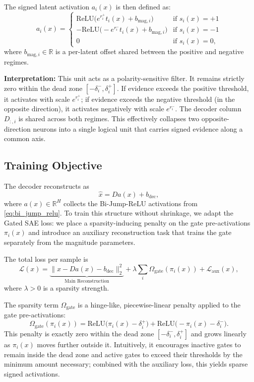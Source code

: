 \documentclass{article}
\begin{document}
The signed latent activation $a_i(x)$ is then defined as:
\begin{equation}
    \label{eq:bi_jump_relu}
    a_i(x) = 
    \begin{cases} 
        \text{ReLU}\big(e^{r_i^+} t_i(x) + b_{\text{mag}, i}\big) & \text{if } s_i(x) = +1 \\
        -\text{ReLU}\big(-e^{r_i^-} t_i(x) + b_{\text{mag}, i}\big) & \text{if } s_i(x) = -1 \\
        0 & \text{if } s_i(x) = 0,
    \end{cases}
\end{equation}
where $b_{\text{mag},i} \in \mathbb{R}$ is a per-latent offset shared between the positive and negative regimes.

\textbf{Interpretation:} This unit acts as a polarity-sensitive filter. It remains strictly zero within the dead zone $[-\delta_i^-, \delta_i^+]$. If evidence exceeds the positive threshold, it activates with scale $e^{r_i^+}$; if evidence exceeds the negative threshold (in the opposite direction), it activates negatively with scale $e^{r_i^-}$. The decoder column $D_{:,i}$ is shared across both regimes. This effectively collapses two opposite-direction neurons into a single logical unit that carries signed evidence along a common axis.

\subsection{Training Objective}

The decoder reconstructs as
\begin{equation}
    \hat{x} = D a(x) + b_{\text{dec}},
\end{equation}
where $a(x) \in \mathbb{R}^H$ collects the Bi-Jump-ReLU activations from \cref{eq:bi_jump_relu}. To train this structure without shrinkage, we adapt the Gated SAE loss: we place a sparsity-inducing penalty on the gate pre-activations $\pi_i(x)$ and introduce an auxiliary reconstruction task that trains the gate separately from the magnitude parameters.

The total loss per sample is
\begin{equation}
    \mathcal{L}(x) = \underbrace{\|x - D a(x) - b_{\text{dec}}\|_2^2}_{\text{Main Reconstruction}} + \lambda \sum_i \Omega_{\text{gate}}(\pi_i(x)) + \mathcal{L}_{\text{aux}}(x),
\end{equation}
where $\lambda > 0$ is a sparsity strength.

The sparsity term $\Omega_{\text{gate}}$ is a hinge-like, piecewise-linear penalty applied to the gate pre-activations:
\begin{equation}
    \Omega_{\text{gate}}(\pi_i(x)) = \text{ReLU}\big(\pi_i(x) - \delta_i^+\big) + \text{ReLU}\big(-\pi_i(x) - \delta_i^-\big).
\end{equation}
This penalty is exactly zero within the dead zone $[-\delta_i^-, \delta_i^+]$ and grows linearly as $\pi_i(x)$ moves further outside it. Intuitively, it encourages inactive gates to remain inside the dead zone and active gates to exceed their thresholds by the minimum amount necessary; combined with the auxiliary loss, this yields sparse signed activations.
\end{document}
